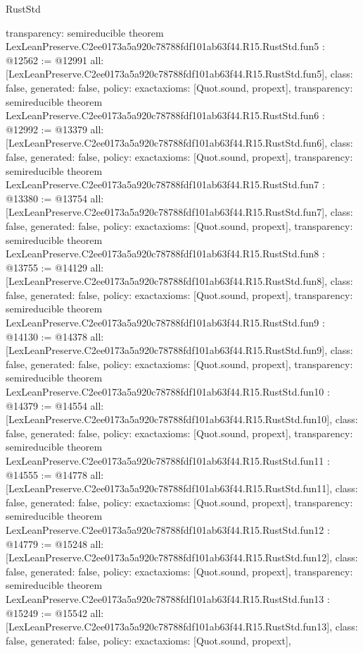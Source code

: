 \begin{lexlean}{RustStd}
\begin{coremodule}
{  transparency: semireducible
}
theorem LexLeanPreserve.C2ee0173a5a920c78788fdf101ab63f44.R15.RustStd.fun5 : @12562 := @12991 {
  all: [LexLeanPreserve.C2ee0173a5a920c78788fdf101ab63f44.R15.RustStd.fun5],
  class: false,
  generated: false,
  policy: exact{axioms: [Quot.sound, propext]},
  transparency: semireducible
}
theorem LexLeanPreserve.C2ee0173a5a920c78788fdf101ab63f44.R15.RustStd.fun6 : @12992 := @13379 {
  all: [LexLeanPreserve.C2ee0173a5a920c78788fdf101ab63f44.R15.RustStd.fun6],
  class: false,
  generated: false,
  policy: exact{axioms: [Quot.sound, propext]},
  transparency: semireducible
}
theorem LexLeanPreserve.C2ee0173a5a920c78788fdf101ab63f44.R15.RustStd.fun7 : @13380 := @13754 {
  all: [LexLeanPreserve.C2ee0173a5a920c78788fdf101ab63f44.R15.RustStd.fun7],
  class: false,
  generated: false,
  policy: exact{axioms: [Quot.sound, propext]},
  transparency: semireducible
}
theorem LexLeanPreserve.C2ee0173a5a920c78788fdf101ab63f44.R15.RustStd.fun8 : @13755 := @14129 {
  all: [LexLeanPreserve.C2ee0173a5a920c78788fdf101ab63f44.R15.RustStd.fun8],
  class: false,
  generated: false,
  policy: exact{axioms: [Quot.sound, propext]},
  transparency: semireducible
}
theorem LexLeanPreserve.C2ee0173a5a920c78788fdf101ab63f44.R15.RustStd.fun9 : @14130 := @14378 {
  all: [LexLeanPreserve.C2ee0173a5a920c78788fdf101ab63f44.R15.RustStd.fun9],
  class: false,
  generated: false,
  policy: exact{axioms: [Quot.sound, propext]},
  transparency: semireducible
}
theorem LexLeanPreserve.C2ee0173a5a920c78788fdf101ab63f44.R15.RustStd.fun10 : @14379 := @14554 {
  all: [LexLeanPreserve.C2ee0173a5a920c78788fdf101ab63f44.R15.RustStd.fun10],
  class: false,
  generated: false,
  policy: exact{axioms: [Quot.sound, propext]},
  transparency: semireducible
}
theorem LexLeanPreserve.C2ee0173a5a920c78788fdf101ab63f44.R15.RustStd.fun11 : @14555 := @14778 {
  all: [LexLeanPreserve.C2ee0173a5a920c78788fdf101ab63f44.R15.RustStd.fun11],
  class: false,
  generated: false,
  policy: exact{axioms: [Quot.sound, propext]},
  transparency: semireducible
}
theorem LexLeanPreserve.C2ee0173a5a920c78788fdf101ab63f44.R15.RustStd.fun12 : @14779 := @15248 {
  all: [LexLeanPreserve.C2ee0173a5a920c78788fdf101ab63f44.R15.RustStd.fun12],
  class: false,
  generated: false,
  policy: exact{axioms: [Quot.sound, propext]},
  transparency: semireducible
}
theorem LexLeanPreserve.C2ee0173a5a920c78788fdf101ab63f44.R15.RustStd.fun13 : @15249 := @15542 {
  all: [LexLeanPreserve.C2ee0173a5a920c78788fdf101ab63f44.R15.RustStd.fun13],
  class: false,
  generated: false,
  policy: exact{axioms: [Quot.sound, propext]},
}
\end{coremodule}
\end{lexlean}
